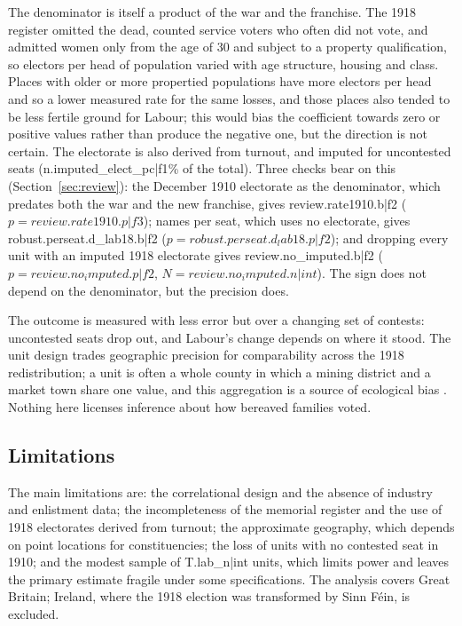 \documentclass[11pt,a4paper]{article}
\begin{document}
The denominator is itself a product of the war and the franchise. The 1918 register omitted the dead, counted service voters who often did not vote, and admitted women only from the age of 30 and subject to a property qualification, so electors per head of population varied with age structure, housing and class. Places with older or more propertied populations have more electors per head and so a lower measured rate for the same losses, and those places also tended to be less fertile ground for Labour; this would bias the coefficient towards zero or positive values rather than produce the negative one, but the direction is not certain. The electorate is also derived from turnout, and imputed for uncontested seats ({{n.imputed_elect_pc|f1}}\% of the total). Three checks bear on this (Section~\ref{sec:review}): the December 1910 electorate as the denominator, which predates both the war and the new franchise, gives {{review.rate1910.b|f2}} ($p={{review.rate1910.p|f3}}$); names per seat, which uses no electorate, gives {{robust.perseat.d_lab18.b|f2}} ($p={{robust.perseat.d_lab18.p|f2}}$); and dropping every unit with an imputed 1918 electorate gives {{review.no_imputed.b|f2}} ($p={{review.no_imputed.p|f2}}$, $N={{review.no_imputed.n|int}}$). The sign does not depend on the denominator, but the precision does.

The outcome is measured with less error but over a changing set of contests: uncontested seats drop out, and Labour's change depends on where it stood. The unit design trades geographic precision for comparability across the 1918 redistribution; a unit is often a whole county in which a mining district and a market town share one value, and this aggregation is a source of ecological bias \citep{robinson1950,king1997}. Nothing here licenses inference about how bereaved families voted.

\subsection{Limitations}
The main limitations are: the correlational design and the absence of industry and enlistment data; the incompleteness of the memorial register and the use of 1918 electorates derived from turnout; the approximate geography, which depends on point locations for constituencies; the loss of units with no contested seat in 1910; and the modest sample of {{T.lab_n|int}} units, which limits power and leaves the primary estimate fragile under some specifications. The analysis covers Great Britain; Ireland, where the 1918 election was transformed by Sinn F\'ein, is excluded.
\end{document}

